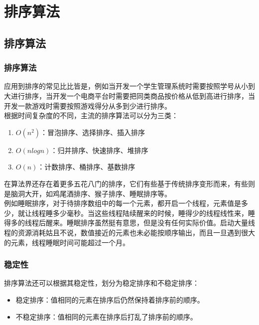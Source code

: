\chapter{排序算法}

\section{排序算法}

\subsection{排序算法}

应用到排序的常见比比皆是，例如当开发一个学生管理系统时需要按照学号从小到大进行排序，当开发一个电商平台时需要把同类商品按价格从低到高进行排序，当开发一款游戏时需要按照游戏得分从多到少进行排序。 \\

根据时间复杂度的不同，主流的排序算法可以分为三类：

\begin{enumerate}
    \item $ O(n^2) $：冒泡排序、选择排序、插入排序
    \item $ O(nlogn) $：归并排序、快速排序、堆排序
    \item $ O(n) $：计数排序、桶排序、基数排序
\end{enumerate}

在算法界还存在着更多五花八门的排序，它们有些基于传统排序变形而来，有些则是脑洞大开，如鸡尾酒排序、猴子排序、睡眠排序等。 \\

例如睡眠排序，对于待排序数组中的每一个元素，都开启一个线程，元素值是多少，就让线程睡多少毫秒。当这些线程陆续醒来的时候，睡得少的线程线性来，睡得多的线程后醒来。睡眠排序虽然挺有意思，但是没有任何实际价值。启动大量线程的资源消耗姑且不说，数值接近的元素也未必能按顺序输出，而且一旦遇到很大的元素，线程睡眠时间可能超过一个月。

\subsection{稳定性}

排序算法还可以根据其稳定性，划分为稳定排序和不稳定排序：

\begin{itemize}
    \item 稳定排序：值相同的元素在排序后仍然保持着排序前的顺序。
    \item 不稳定排序：值相同的元素在排序后打乱了排序前的顺序。
\end{itemize}

